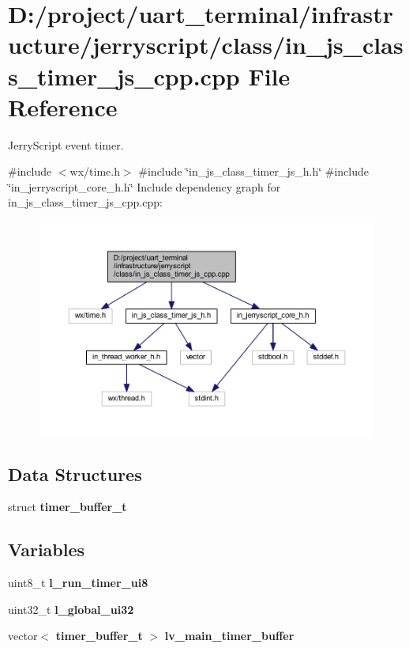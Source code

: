 \section{D\+:/project/uart\+\_\+terminal/infrastructure/jerryscript/class/in\+\_\+js\+\_\+class\+\_\+timer\+\_\+js\+\_\+cpp.cpp File Reference}
\label{in__js__class__timer__js__cpp_8cpp}


Jerry\+Script event timer.  


{\ttfamily \#include $<$wx/time.\+h$>$}\newline
{\ttfamily \#include \char`\"{}in\+\_\+js\+\_\+class\+\_\+timer\+\_\+js\+\_\+h.\+h\char`\"{}}\newline
{\ttfamily \#include \char`\"{}in\+\_\+jerryscript\+\_\+core\+\_\+h.\+h\char`\"{}}\newline
Include dependency graph for in\+\_\+js\+\_\+class\+\_\+timer\+\_\+js\+\_\+cpp.\+cpp\+:
\nopagebreak
\begin{figure}[H]
\begin{center}
\leavevmode
\includegraphics[width=350pt]{in__js__class__timer__js__cpp_8cpp__incl}
\end{center}
\end{figure}
\subsection*{Data Structures}
\begin{DoxyCompactItemize}
\item 
struct \textbf{ timer\+\_\+buffer\+\_\+t}
\end{DoxyCompactItemize}
\subsection*{Variables}
\begin{DoxyCompactItemize}
\item 
uint8\+\_\+t \textbf{ l\+\_\+run\+\_\+timer\+\_\+ui8}
\item 
uint32\+\_\+t {\bfseries l\+\_\+global\+\_\+ui32}
\item 
vector$<$ \textbf{ timer\+\_\+buffer\+\_\+t} $>$ {\bfseries lv\+\_\+main\+\_\+timer\+\_\+buffer}
\end{DoxyCompactItemize}


